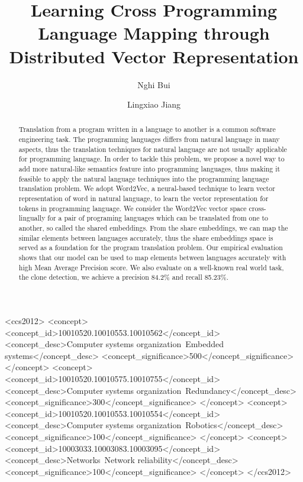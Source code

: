 \documentclass[sigconf]{acmart}
\begin{document}
\title{Learning Cross Programming Language Mapping through Distributed Vector Representation}


\author{Nghi Bui}


\author{Lingxiao Jiang}


\renewcommand{\shortauthors}{Nghi et al.}


\begin{abstract}
Translation from a program written in a language to another is a common software engineering task. The programming languages differs from natural language in many aspects, thus the translation techniques for natural language are not usually applicable for programming language. In order to tackle this problem, we propose a novel way to add more natural-like semantics feature into programming languages, thus making it feasible to apply the natural language techniques into the programming language translation problem. We adopt Word2Vec, a neural-based technique to learn vector representation of word in natural language, to learn the vector representation for tokens in programming language. We consider the Word2Vec vector space cross-lingually for a pair of programing languages which can be translated from one to another, so called the shared embeddings. From the share embeddings, we can map the similar elements between languages accurately, thus the share embeddings space is served as a foundation for the program translation problem. Our empirical evaluation shows that our model can be used to map elements between languages accurately with high Mean Average Precision score. We also evaluate on a well-known real world task, the clone detection, we achieve a precision 84.2\% and recall 85.23\%.
\end{abstract}

%
%
\begin{CCSXML}
<ccs2012>
 <concept>
  <concept_id>10010520.10010553.10010562</concept_id>
  <concept_desc>Computer systems organization~Embedded systems</concept_desc>
  <concept_significance>500</concept_significance>
 </concept>
 <concept>
  <concept_id>10010520.10010575.10010755</concept_id>
  <concept_desc>Computer systems organization~Redundancy</concept_desc>
  <concept_significance>300</concept_significance>
 </concept>
 <concept>
  <concept_id>10010520.10010553.10010554</concept_id>
  <concept_desc>Computer systems organization~Robotics</concept_desc>
  <concept_significance>100</concept_significance>
 </concept>
 <concept>
  <concept_id>10003033.10003083.10003095</concept_id>
  <concept_desc>Networks~Network reliability</concept_desc>
  <concept_significance>100</concept_significance>
 </concept>
</ccs2012>  
\end{CCSXML}
\end{document}
